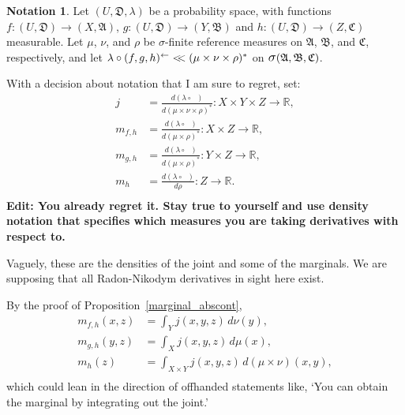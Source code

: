 \documentclass[
twoside=true,
paper=letter,
fontsize=9pt,
pagesize=auto,
leqno,
openany,
headsepline,
overfullrule,
]{scrbook}
\theoremstyle{plain}
\theoremstyle{plain}
\theoremstyle{definition}
\newtheorem{notn}[thm]{Notation}
\theoremstyle{bfnoteitalic}
\theoremstyle{bfnoteroman}
\newcommand{\sigalg}[1]{\mathfrak{#1}}
\newcommand{\sagb}{\mathop{\hbox{\large{$\sigma$}}}\nolimits}
\newcommand{\textsigma}{\hbox{\large{$\sigma$}}\kern-1pt}
\newcommand{\preimage}[1]{\mathop{#1^{\leftarrow}}}
\newcommand{\R}{\mathbb{R}}
\newcommand{\sigmaalgebra}{\sigalg{A}}
\newcommand{\sigmaalgebraii}{\sigalg{B}}
\newcommand{\sigmaalgebraiii}{\sigalg{C}}
\newcommand{\productsig}[2]{\sagb(#1,#2)}
\newcommand{\funcf}{f}
\newcommand{\funcg}{g}
\newcommand{\funch}{h}
\newcommand{\funcj}{j}
\newcommand{\function}{f}
\newcommand{\functionii}{g}
\newcommand{\functioniii}{h}
\newcommand{\measurespace}{X}
\newcommand{\measurespaceii}{Y}
\newcommand{\measurespaceiii}{Z}
\newcommand{\mspaceelt}{x}
\newcommand{\mspaceeltii}{y}
\newcommand{\mspaceeltiii}{z}
\newcommand{\abscont}{\mathrel{< \kern-3.5pt <}}
\newcommand{\measure}{\mu}
\newcommand{\measmu}{\mu}
\newcommand{\measureii}{\nu}
\newcommand{\measnu}{\nu}
\newcommand{\measlambda}{\lambda}
\newcommand{\measureiv}{\rho}
\newcommand{\measrho}{\rho}
\newcommand{\uspace}{U}%
\newcommand{\uspacesig}{\sigalg{D}}
\begin{document}
\begin{notn}\label{densities}
Let
$(\uspace,\uspacesig,\measlambda)$ be a probability space, with functions
$\funcf:(\uspace,\uspacesig)\to (\measurespace,\sigmaalgebra)$,
$\funcg:(\uspace,\uspacesig)\to (\measurespaceii,\sigmaalgebraii)$
and
$\funch:(\uspace,\uspacesig)\to (\measurespaceiii,\sigmaalgebraiii)$
measurable.
Let $\measmu$, $\measnu$, and $\measrho$ be \textsigma\hyp{}finite reference measures on
$\sigmaalgebra$, $\sigmaalgebraii$, and $\sigmaalgebraiii$, respectively, and let
$\measlambda\circ\preimage{(\funcf,\funcg,\funch)}
\abscont
(\measure\times\measureii\times\measureiv)^*$ on
$\productsig{\sigmaalgebra,\sigmaalgebraii}{\sigmaalgebraiii}$.

With a decision about notation that I am sure to regret, set:
\begin{align*}
j
& =
\frac{d (\measlambda\circ\preimage{(\funcf,\funcg,\funch)})}
{d(\measmu\times\measnu\times\measrho)^*}
:
\measurespace\times\measurespaceii\times\measurespaceiii\to\R,
\\
m_{\funcf,\funch}
& =
\frac{d (\measlambda\circ\preimage{(\funcf,\funch)} )}
{d(\measmu\times\measrho)^*}:\measurespace\times\measurespaceiii\to\R,
\\
m_{\funcg,\funch}
& =
\frac{d (\measlambda\circ\preimage{(\funcg,\funch)} )}
{d(\measmu\times\measrho)^*}:\measurespaceii\times\measurespaceiii\to\R,
\\
m_\funch
& =
\frac{d (\measlambda\circ\preimage{\funch})}
{d \measrho}:\measurespaceiii\to\R.
\\
\end{align*}
\textbf{Edit: You already regret it.
Stay true to yourself and use density notation that specifies which measures you are taking derivatives with respect to.
}

\noindent
Vaguely, these are the densities of the joint and some of the marginals.
We are supposing that all Radon-Nikodym derivatives in sight here exist.

By the proof of Proposition~\ref{marginal_abscont},
\begin{align*}
m_{\function,\functioniii} (\mspaceelt,\mspaceeltiii)
& =
\int_\measurespaceii
\funcj(\mspaceelt,\mspaceeltii,\mspaceeltiii)\,
d \measnu(\mspaceeltii),
\\
m_{\functionii,\functioniii} (\mspaceeltii,\mspaceeltiii)
& =
\int_\measurespace
\funcj(\mspaceelt,\mspaceeltii,\mspaceeltiii)\,
d \measmu(\mspaceelt),
\\
m_\funch(\mspaceeltiii)
& =
\int_{\measurespace\times\measurespaceii}
\funcj(\mspaceelt,\mspaceeltii,\mspaceeltiii)\,
d(\measmu\times\measnu)(\mspaceelt,\mspaceeltii),
\\
\end{align*}
which could lean in the direction of offhanded statements like,
`You can obtain the marginal by integrating out the joint.'


\end{notn}
\end{document}
